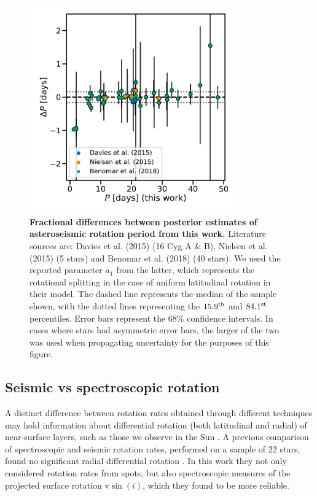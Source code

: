 \begin{figure}[h!]
	\centering
	\includegraphics[width=0.8\textwidth]{Images/seis_comparison_rot_alt2.pdf}
	\caption{\textbf{Fractional differences between posterior estimates of asteroseismic rotation period from this work.} Literature sources are: Davies et al. (2015) \cite{davies+2015} (16 Cyg A \& B), Nielsen et al. (2015) \cite{nielsen+2015} (5 stars) and Benomar et al. (2018) \cite{benomar+2018} (40 stars). We used the reported parameter $a_{1}$ from the latter, which represents the rotational splitting in the case of uniform latitudinal rotation in their model. The dashed line represents the median of the sample shown, with the dotted lines representing the $15.9^{\rm{th}}$ and $84.1^{\rm{st}}$ percentiles. Error bars represent the 68\% confidence intervals. In cases where stars had asymmetric error bars, the larger of the two was used when propagating uncertainty for the purposes of this figure.}
	\label{fig:literaturecomp}
\end{figure}

\subsection{Seismic vs spectroscopic rotation}
A distinct difference between rotation rates obtained through different techniques may hold information about differential rotation (both latitudinal and radial) of near-surface layers, such as those we observe in the Sun \cite{beck2000}.  A previous comparison of spectroscopic and seismic rotation rates, performed on a sample of 22 stars, found no significant radial differential rotation \cite{benomar+2018}. In this work they not only considered rotation rates from spots, but also spectroscopic measures of the projected surface rotation $\textrm{v}\sin(i)$, which they found to be more reliable.

